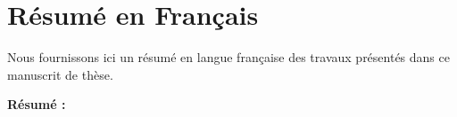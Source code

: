 \chapter{Résumé en Français}
\label{app:fr_small}

Nous fournissons ici un résumé en langue française des travaux présentés dans ce manuscrit de thèse.

\textbf{Résumé :}

\todomarker{}